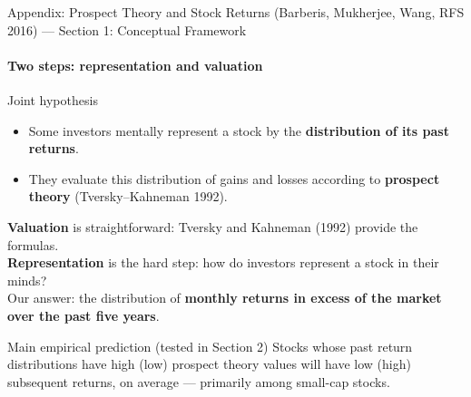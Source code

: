 \documentclass[aspectratio=169, 11pt]{beamer}
\begin{document}
\begin{frame}[shrink=8,label=apx_pt_framework]{Appendix: Prospect Theory and Stock Returns (Barberis, Mukherjee, Wang, RFS 2016) --- Section 1: Conceptual Framework}
\framesubtitle{Two steps: representation and valuation}
\begin{block}{Joint hypothesis}
\begin{itemize}
  \item Some investors \alert{mentally represent a stock} by the \textbf{distribution of its past returns}.
  \item They \alert{evaluate} this distribution of gains and losses according to \textbf{prospect theory} (Tversky--Kahneman 1992).
\end{itemize}
\end{block}
\vspace{0.3em}
\textbf{Valuation} is straightforward: Tversky and Kahneman (1992) provide the formulas.\\[0.3em]
\textbf{Representation} is the hard step: how do investors represent a stock in their minds?\\[0.3em]
Our answer: the distribution of \textbf{monthly returns in excess of the market over the past five years}.\\[0.5em]
\begin{block}{Main empirical prediction (tested in Section 2)}
Stocks whose past return distributions have \alert{high (low) prospect theory values} will have \alert{low (high) subsequent returns}, on average --- primarily among small-cap stocks.
\end{block}
\end{frame}
\end{document}
